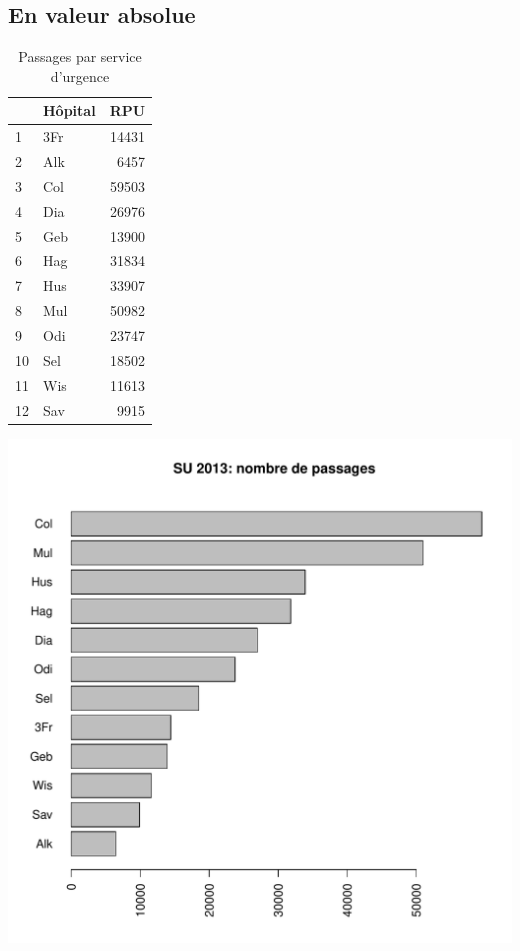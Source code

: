 \documentclass[12pt,english,french,twoside]{report}\usepackage[]{graphicx}\usepackage[]{color}
\makeatletter
\def\maxwidth{ %
  \ifdim\Gin@nat@width>\linewidth
    \linewidth
  \else
    \Gin@nat@width
  \fi
}
\makeatother
\begin{document}
\subsection*{En valeur absolue}
\begin{table}[ht]
\centering
\begin{tabular}{llr}
  \hline
 & Hôpital & RPU \\ 
  \hline
1 & 3Fr & 14431 \\ 
  2 & Alk & 6457 \\ 
  3 & Col & 59503 \\ 
  4 & Dia & 26976 \\ 
  5 & Geb & 13900 \\ 
  6 & Hag & 31834 \\ 
  7 & Hus & 33907 \\ 
  8 & Mul & 50982 \\ 
  9 & Odi & 23747 \\ 
  10 & Sel & 18502 \\ 
  11 & Wis & 11613 \\ 
  12 & Sav & 9915 \\ 
   \hline
\end{tabular}
\caption[Nombre de passages par service d'urgence]{Passages par service d'urgence} 
\label{fig:passage_su}
\end{table}

\includegraphics[width=\maxwidth]{figure/val_abs} 
\end{document}
